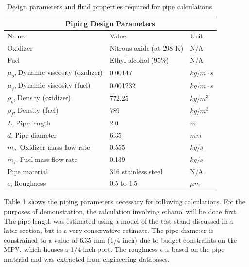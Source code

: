 \documentclass[9pt]{article} %
\numberwithin{equation}{section} %
\begin{document}
\begin{table}[!htb]
\centering
\begin{tabular}{ |p{5cm}||p{4.5cm}|p{1.75cm}|  }
\hline
\multicolumn{3}{|c|}{Piping Design Parameters} \\
\hline
Name & Value & Unit \\
\hline
Oxidizer &  Nitrous oxide (at 298 K) & N/A \\
Fuel  &  Ethyl alcohol ($95\%$)   &  N/A \\
$\mu_{o}$, Dynamic viscosity (oxidizer) &  0.00147  &  $kg/m \cdot s$ \\
$\mu_{f}$, Dynamic viscosity (fuel) &  0.001232  &  $kg/m \cdot s$ \\
$\rho_{o}$, Density (oxidizer) &  772.25  &  $kg/m^{3}$ \\
$\rho_{f}$, Density (fuel) &  789  &  $kg/m^{3}$ \\
$L$, Pipe length  &  2.0  &  $m$   \\
$d$, Pipe diameter  &  6.35  &  $mm$ \\
$\dot{m}_{o}$, Oxidizer mass flow rate  &  0.555  &  $kg/s$ \\
$\dot{m}_{f}$, Fuel mass flow rate  &  0.139  &  $kg/s$ \\
Pipe material  &  316 stainless steel &  N/A  \\
$\epsilon$, Roughness  &  0.5 to 1.5  &  $\mu m$  \\
\hline
\end{tabular}
\caption{Design parameters and fluid properties required for pipe calculations.}
\label{table:piping_parameters}
\end{table}

Table \ref{table:piping_parameters} shows the piping parameters necessary for following calculations. For the purposes of demonstration, the calculation involving ethanol will be done first. The pipe length was estimated using a model of the test stand discussed in a later section, but is a very conservative estimate. The pipe diameter is constrained to a value of 6.35 mm (1/4 inch) due to budget constraints on the MPV, which houses a 1/4 inch port. The roughness $\epsilon$ is based on the pipe material and was extracted from engineering databases.
\end{document}
